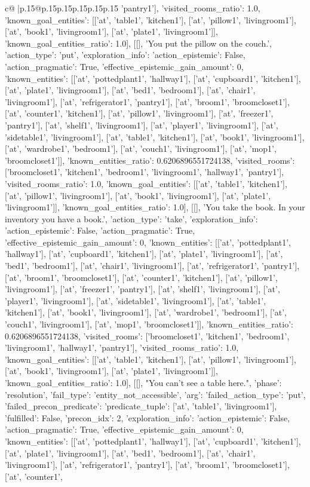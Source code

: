 \documentclass{article}
\begin{document}
{\begin{supertabular}{c@{$\;$}|p{.15\linewidth}@{}p{.15\linewidth}p{.15\linewidth}p{.15\linewidth}p{.15\linewidth}p{.15\linewidth}}
{{{'pantry1'], 'visited_rooms_ratio': 1.0, 'known_goal_entities': [['at', 'table1', 'kitchen1'], ['at', 'pillow1', 'livingroom1'], ['at', 'book1', 'livingroom1'], ['at', 'plate1', 'livingroom1']], 'known_goal_entities_ratio': 1.0}}], [[], 'You put the pillow on the couch.', {'action_type': 'put', 'exploration_info': {'action_epistemic': False, 'action_pragmatic': True, 'effective_epistemic_gain_amount': 0, 'known_entities': [['at', 'pottedplant1', 'hallway1'], ['at', 'cupboard1', 'kitchen1'], ['at', 'plate1', 'livingroom1'], ['at', 'bed1', 'bedroom1'], ['at', 'chair1', 'livingroom1'], ['at', 'refrigerator1', 'pantry1'], ['at', 'broom1', 'broomcloset1'], ['at', 'counter1', 'kitchen1'], ['at', 'pillow1', 'livingroom1'], ['at', 'freezer1', 'pantry1'], ['at', 'shelf1', 'livingroom1'], ['at', 'player1', 'livingroom1'], ['at', 'sidetable1', 'livingroom1'], ['at', 'table1', 'kitchen1'], ['at', 'book1', 'livingroom1'], ['at', 'wardrobe1', 'bedroom1'], ['at', 'couch1', 'livingroom1'], ['at', 'mop1', 'broomcloset1']], 'known_entities_ratio': 0.6206896551724138, 'visited_rooms': ['broomcloset1', 'kitchen1', 'bedroom1', 'livingroom1', 'hallway1', 'pantry1'], 'visited_rooms_ratio': 1.0, 'known_goal_entities': [['at', 'table1', 'kitchen1'], ['at', 'pillow1', 'livingroom1'], ['at', 'book1', 'livingroom1'], ['at', 'plate1', 'livingroom1']], 'known_goal_entities_ratio': 1.0}}], [[], 'You take the book. In your inventory you have a book.', {'action_type': 'take', 'exploration_info': {'action_epistemic': False, 'action_pragmatic': True, 'effective_epistemic_gain_amount': 0, 'known_entities': [['at', 'pottedplant1', 'hallway1'], ['at', 'cupboard1', 'kitchen1'], ['at', 'plate1', 'livingroom1'], ['at', 'bed1', 'bedroom1'], ['at', 'chair1', 'livingroom1'], ['at', 'refrigerator1', 'pantry1'], ['at', 'broom1', 'broomcloset1'], ['at', 'counter1', 'kitchen1'], ['at', 'pillow1', 'livingroom1'], ['at', 'freezer1', 'pantry1'], ['at', 'shelf1', 'livingroom1'], ['at', 'player1', 'livingroom1'], ['at', 'sidetable1', 'livingroom1'], ['at', 'table1', 'kitchen1'], ['at', 'book1', 'livingroom1'], ['at', 'wardrobe1', 'bedroom1'], ['at', 'couch1', 'livingroom1'], ['at', 'mop1', 'broomcloset1']], 'known_entities_ratio': 0.6206896551724138, 'visited_rooms': ['broomcloset1', 'kitchen1', 'bedroom1', 'livingroom1', 'hallway1', 'pantry1'], 'visited_rooms_ratio': 1.0, 'known_goal_entities': [['at', 'table1', 'kitchen1'], ['at', 'pillow1', 'livingroom1'], ['at', 'book1', 'livingroom1'], ['at', 'plate1', 'livingroom1']], 'known_goal_entities_ratio': 1.0}}], [[], "You can't see a table here.", {'phase': 'resolution', 'fail_type': 'entity_not_accessible', 'arg': {'failed_action_type': 'put', 'failed_precon_predicate': {'predicate_tuple': ['at', 'table1', 'livingroom1'], 'fulfilled': False, 'precon_idx': 2}}, 'exploration_info': {'action_epistemic': False, 'action_pragmatic': True, 'effective_epistemic_gain_amount': 0, 'known_entities': [['at', 'pottedplant1', 'hallway1'], ['at', 'cupboard1', 'kitchen1'], ['at', 'plate1', 'livingroom1'], ['at', 'bed1', 'bedroom1'], ['at', 'chair1', 'livingroom1'], ['at', 'refrigerator1', 'pantry1'], ['at', 'broom1', 'broomcloset1'], ['at', 'counter1', }}}
\end{supertabular}}
\end{document}
